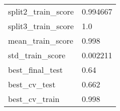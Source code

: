 \begin{tabular}{ll}
split2\_train\_score            &                                           0.994667 \\
split3\_train\_score            &                                                1.0 \\
mean\_train\_score              &                                              0.998 \\
std\_train\_score               &                                           0.002211 \\
best\_final\_test               &                                               0.64 \\
best\_cv\_test                  &                                              0.662 \\
best\_cv\_train                 &                                              0.998 \\
\bottomrule
\end{tabular}
